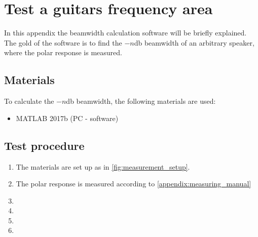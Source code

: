\chapter*{Test a guitars frequency area}
In this appendix the beamwidth calculation software will be briefly explained. The gold of the software is to find the $-n$\si{\decibel} beamwidth of an arbitrary speaker, where the polar response is measured. 

\section*{Materials}
To calculate the $-n$\si{\decibel} beamwidth, the following materials are used:
\begin{itemize}
\item MATLAB 2017b (PC - software)
\end{itemize}


\section*{Test procedure}


\begin{enumerate}
\item The materials are set up as in \autoref{fig:measurement_setup}.
\item The polar response is measured according to \autoref{appendix:measuring_manual}
\item  
\item  
\item 
\item 
\end{enumerate}



